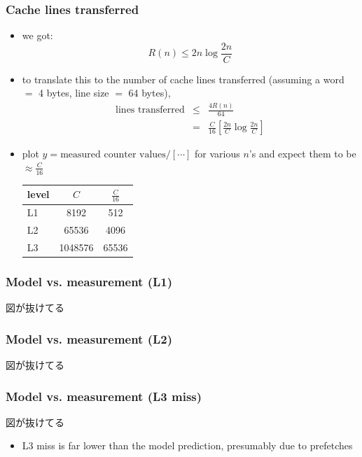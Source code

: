 \documentclass[12pt,dvipdfmx]{beamer}
\begin{document}
\iffalse
\begin{frame}[fragile]
\frametitle{Cache lines transferred}

\begin{itemize}
\item we got:
\[ R(n) \leq 2n \log\frac{2n}{C} \]

\item to translate this to the number of cache lines 
  transferred (assuming a word $=$ 4 bytes, line size $=$ 64 bytes),
  \begin{eqnarray*}
\mbox{lines transferred} 
& \leq & \frac{4 R(n)}{64} \\
& = & \frac{C}{16} \left[ \frac{2n}{C} \log\frac{2n}{C} \right]
  \end{eqnarray*}
\item plot $y = \mbox{measured counter values}/[ \cdots ]$
  for various $n$'s 
  and expect them to be $\approx \frac{C}{16}$
\begin{center}
\begin{tabular}{|l|c|c|}\hline
level & $C$ & $\frac{C}{16}$ \\\hline
L1 & 8192 & 512 \\
L2 & 65536 & 4096 \\
L3 & 1048576 & 65536 \\\hline
\end{tabular}
\end{center}
\end{itemize}
\end{frame}


\begin{frame}
\frametitle{Model vs. measurement (L1)}
\begin{center}
\def\svgwidth{0.8\textwidth}  
図が抜けてる
\end{center}
\end{frame}

\begin{frame}
\frametitle{Model vs. measurement (L2)}
\begin{center}
\def\svgwidth{0.8\textwidth}  
図が抜けてる
\end{center}
\end{frame}


\begin{frame}
\frametitle{Model vs. measurement (L3 miss)}
\begin{center}
\def\svgwidth{0.8\textwidth}  
図が抜けてる
\end{center}

\begin{itemize}
\item L3 miss is far lower than the model prediction, 
  presumably due to prefetches
\end{itemize}

\end{frame}
\end{document}
